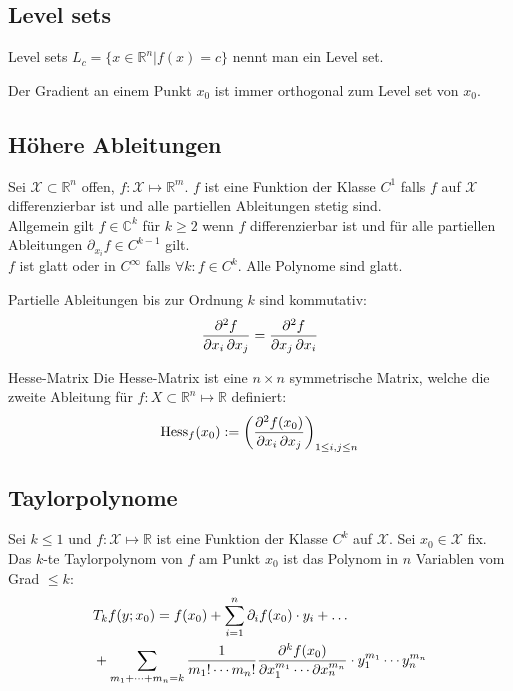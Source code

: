 \documentclass[a4paper,10pt]{article}
\def\R{\mathbb{R}}
\def\C{\mathbb{C}}
\def\X{\mathcal{X}}
\begin{document}
\subsection{Level sets}

\begin{mainbox}{Level sets}
  $L_c = \{ x \in \mathbb{R}^n | f(x) = c \}$ nennt man ein Level set.
\end{mainbox}

Der Gradient an einem Punkt $x_0$ ist immer orthogonal zum Level set von $x_0$. 

\subsection{Höhere Ableitungen}
Sei \(\X \subset \R^n\) offen, \(f: \X \mapsto \R^m\). \(f\) ist eine Funktion der Klasse \(C^1\) falls \(f\) auf \(\X\) differenzierbar ist und alle partiellen Ableitungen stetig sind. \\
Allgemein gilt \(f \in \C^k\) für \(k \ge 2\) wenn \(f\) differenzierbar ist und für alle partiellen Ableitungen \(\partial_{x_i} f \in C^{k-1}\) gilt. \\
\(f\) ist glatt oder in \(C^\infty\) falls \(\forall k: f \in C^k \). Alle Polynome sind glatt.

Partielle Ableitungen bis zur Ordnung \(k\) sind kommutativ:
$$\pdv{f}{x_i, x_j} = \pdv{f}{ x_j, x_i}$$

\begin{mainbox}{Hesse-Matrix}
  Die Hesse-Matrix ist eine \(n \times n\) symmetrische Matrix, welche die zweite Ableitung für $f: X \subset \mathbb{R}^n \mapsto \mathbb{R}$ definiert:
  \[\text{Hess}_f(x_0) := \left(\pdv{f(x_0)}{x_i, x_j}\right)_{1\le i,j \le n}\] 
\end{mainbox}
\subsection{Taylorpolynome}
Sei \(k \le 1\) und \(f: \X \mapsto \R\) ist eine Funktion der Klasse \(C^k\) auf \(\X\). Sei \(x_0 \in \X\) fix. Das \(k\)-te Taylorpolynom von \(f\) am Punkt \(x_0\) ist das Polynom in \(n\) Variablen vom Grad \(\le k\):
\begin{align*}
  &T_k f(y; x_0) = f(x_0) + \sum_{i=1}^n \partial_i f(x_0) \cdot y_i + \dots \\
  &+ \sum_{m_1 + \cdots + m_n = k} \frac{1}{m_1! \cdots m_n!} \pdv{^k f(x_0) }{x_1^{m_1} \cdots \partial x_n^{m_n}} \cdot y_1^{m_1} \cdots y_n^{m_n}
\end{align*}
\end{document}
